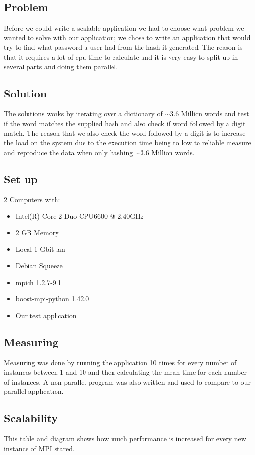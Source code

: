 \documentclass{article}
\begin{document}
{\subsection{Problem}
Before we could write a scalable application we had to choose what problem we
wanted to solve with our application; we chose to write an application that
would try to find what password a user had from the hash it generated.
The reason is that it requires a lot of cpu time to calculate and it is 
very easy to split up in several parts and doing them parallel.

\subsection{Solution}
The solutions works by iterating over a dictionary of $\sim$3.6 Million words
and test if the word matches the supplied hash and also check if word followed
by a digit match. The reason that we also check the word followed by a digit
is to increase the load on the system due to the execution time being to 
low to reliable measure and reproduce the data when only hashing $\sim$3.6
Million words.

\subsection{Set up}
2 Computers with:
\begin{itemize}
\item Intel(R) Core 2 Duo CPU6600  @ 2.40GHz
\item 2 GB Memory
\item Local 1 Gbit lan
\item Debian Squeeze
\item mpich 1.2.7-9.1
\item boost-mpi-python 1.42.0
\item Our test application \cite{pympi-test}
\end{itemize}

\subsection{Measuring}
Measuring was done by running the application 10 times for every number of
instances between 1 and 10 and then calculating the mean time for each 
number of instances. A non parallel program was also written and used to
compare to our parallel application.

\subsection{Scalability}
This table and diagram shows how much performance is increased for every
new instance of MPI stared.

}
\end{document}
